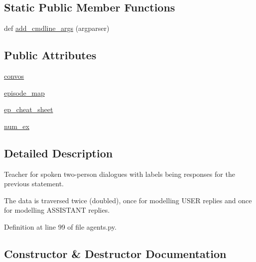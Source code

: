\subsection*{Static Public Member Functions}
\begin{DoxyCompactItemize}
\item 
def \hyperlink{classparlai_1_1tasks_1_1taskmaster_1_1agents_1_1WozDialogueTeacher_a4af3fe28fd0b7558ddf7ed93c311c722}{add\+\_\+cmdline\+\_\+args} (argparser)
\end{DoxyCompactItemize}
\subsection*{Public Attributes}
\begin{DoxyCompactItemize}
\item 
\hyperlink{classparlai_1_1tasks_1_1taskmaster_1_1agents_1_1WozDialogueTeacher_ae7c9af4478d5e53c4467484838dfd5ba}{convos}
\item 
\hyperlink{classparlai_1_1tasks_1_1taskmaster_1_1agents_1_1WozDialogueTeacher_aa3328a99085735dacfe425013036800f}{episode\+\_\+map}
\item 
\hyperlink{classparlai_1_1tasks_1_1taskmaster_1_1agents_1_1WozDialogueTeacher_a75f5e71661e1d07f68dbfb87ba726400}{ep\+\_\+cheat\+\_\+sheet}
\item 
\hyperlink{classparlai_1_1tasks_1_1taskmaster_1_1agents_1_1WozDialogueTeacher_a27b3ee35b98d89914bc5079d8a6e75aa}{num\+\_\+ex}
\end{DoxyCompactItemize}


\subsection{Detailed Description}
\begin{DoxyVerb}Teacher for spoken two-person dialogues with labels being responses for the previous
statement.

The data is traversed twice (doubled), once for modelling USER replies and once for
modelling ASSISTANT replies.
\end{DoxyVerb}
 

Definition at line 99 of file agents.\+py.



\subsection{Constructor \& Destructor Documentation}
\mbox{\label{classparlai_1_1tasks_1_1taskmaster_1_1agents_1_1WozDialogueTeacher_a96c89da471dc6d1983e8c1c509b3be64}} 
